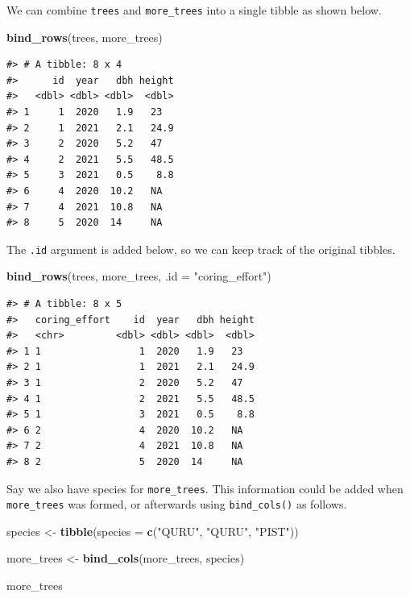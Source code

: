 \documentclass[
  11pt,
]{krantz}
\newenvironment{Shaded}{\begin{snugshade}}{\end{snugshade}}
\newcommand{\DataTypeTok}[1]{\textcolor[rgb]{0.13,0.29,0.53}{#1}}
\newcommand{\KeywordTok}[1]{\textcolor[rgb]{0.13,0.29,0.53}{\textbf{#1}}}
\newcommand{\NormalTok}[1]{#1}
\newcommand{\StringTok}[1]{\textcolor[rgb]{0.31,0.60,0.02}{#1}}
\theoremstyle{definition}
\theoremstyle{definition}
\theoremstyle{definition}
\theoremstyle{definition}
\theoremstyle{remark}
\begin{document}
We can combine \texttt{trees} and \texttt{more\_trees} into a single tibble as shown below.

\begin{Shaded}
\begin{Highlighting}[]
\KeywordTok{bind\_rows}\NormalTok{(trees, more\_trees)}
\end{Highlighting}
\end{Shaded}

\begin{verbatim}
#> # A tibble: 8 x 4
#>      id  year   dbh height
#>   <dbl> <dbl> <dbl>  <dbl>
#> 1     1  2020   1.9   23  
#> 2     1  2021   2.1   24.9
#> 3     2  2020   5.2   47  
#> 4     2  2021   5.5   48.5
#> 5     3  2021   0.5    8.8
#> 6     4  2020  10.2   NA  
#> 7     4  2021  10.8   NA  
#> 8     5  2020  14     NA
\end{verbatim}

The \texttt{.id} argument is added below, so we can keep track of the original tibbles.

\begin{Shaded}
\begin{Highlighting}[]
\KeywordTok{bind\_rows}\NormalTok{(trees, more\_trees, }\DataTypeTok{.id =} \StringTok{"coring\_effort"}\NormalTok{)}
\end{Highlighting}
\end{Shaded}

\begin{verbatim}
#> # A tibble: 8 x 5
#>   coring_effort    id  year   dbh height
#>   <chr>         <dbl> <dbl> <dbl>  <dbl>
#> 1 1                 1  2020   1.9   23  
#> 2 1                 1  2021   2.1   24.9
#> 3 1                 2  2020   5.2   47  
#> 4 1                 2  2021   5.5   48.5
#> 5 1                 3  2021   0.5    8.8
#> 6 2                 4  2020  10.2   NA  
#> 7 2                 4  2021  10.8   NA  
#> 8 2                 5  2020  14     NA
\end{verbatim}

Say we also have species for \texttt{more\_trees}. This information could be added when \texttt{more\_trees} was formed, or afterwards using \texttt{bind\_cols()} as follows.

\begin{Shaded}
\begin{Highlighting}[]
\NormalTok{species \textless{}{-}}\StringTok{ }\KeywordTok{tibble}\NormalTok{(}\DataTypeTok{species =} \KeywordTok{c}\NormalTok{(}\StringTok{"QURU"}\NormalTok{, }\StringTok{"QURU"}\NormalTok{, }\StringTok{"PIST"}\NormalTok{))}

\NormalTok{more\_trees \textless{}{-}}\StringTok{ }\KeywordTok{bind\_cols}\NormalTok{(more\_trees, species)}

\NormalTok{more\_trees}
\end{Highlighting}
\end{Shaded}
\end{document}
